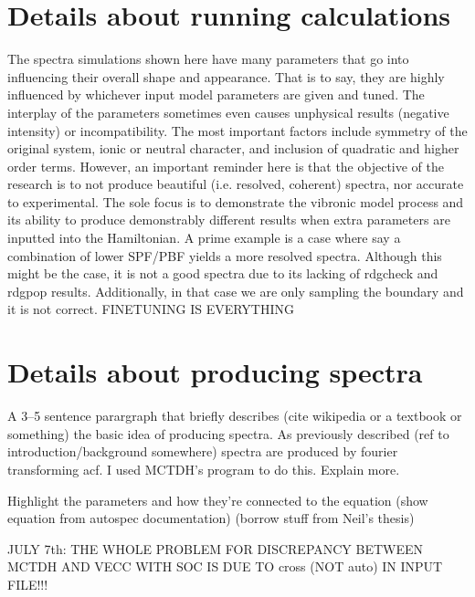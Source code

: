 \section{Details about running calculations}
The spectra simulations shown here have many parameters that go into influencing their overall shape and appearance. That is to say, they are highly influenced by whichever input model parameters are given and tuned. The interplay of the parameters sometimes even causes unphysical results (negative intensity) or incompatibility. The most important factors include symmetry of the original system, ionic or neutral character, and inclusion of quadratic and higher order terms. However, an important reminder here is that the objective of the research is to not produce beautiful (i.e. resolved, coherent) spectra, nor accurate to experimental. The sole focus is to demonstrate the vibronic model process and its ability to produce demonstrably different results when extra parameters are inputted into the Hamiltonian. A prime example is a case where say a combination of lower SPF/PBF yields a more resolved spectra. Although this might be the case, it is not a good spectra due to its lacking of rdgcheck and rdgpop results. Additionally, in that case we are only sampling the boundary and it is not correct. FINETUNING IS EVERYTHING


\section{Details about producing spectra}

A 3--5 sentence parargraph that briefly describes (cite wikipedia or a textbook or something) the basic idea of producing spectra.
As previously described (ref to introduction/background somewhere) spectra are produced by fourier transforming \gls{acf}. I used MCTDH's  program to do this. Explain more.

Highlight the parameters and how they're connected to the equation (show equation from autospec documentation) (borrow stuff from Neil's thesis)

JULY 7th: THE WHOLE PROBLEM FOR DISCREPANCY BETWEEN MCTDH AND VECC WITH SOC IS DUE TO cross (NOT auto) IN INPUT FILE!!!

